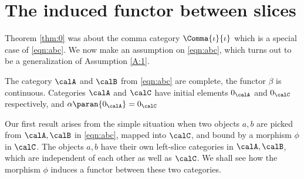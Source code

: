 \documentclass[12pt,oneside]{article}
\begin{document}
\section{The induced functor between slices} \label{sec:induced}

Theorem \ref{thm:0} was about the comma category $\Comma{\iota}{\iota}$ which is a special case of \eqref{eqn:abc}. We now make an assumption on \eqref{eqn:abc}, which turns out to be a generalization of Assumption \ref{A:1}. 

\begin{Assumption} \label{A:2}
	The category $\calA$ and $\calB$ from \eqref{eqn:abc} are complete, the functor $\beta$ is continuous. Categories $\calA$ and $\calC$ have initial elements $0_{\calA}$ and $0_{\calC}$ respectively, and $\alpha \paran{0_{\calA}} = 0_{\calC}$
\end{Assumption}	

Our first result arises from the simple situation when two objects $a, b$  are picked from $\calA, \calB$ in \eqref{eqn:abc}, mapped into $\calC$, and bound by a morphism $\phi$ in $\calC$. The objects $a, b$ have their own left-slice categories in $\calA, \calB$, which are independent of each other as well as $\calC$. We shall see how the morphism $\phi$ induces a functor between these two categories.
\end{document}
